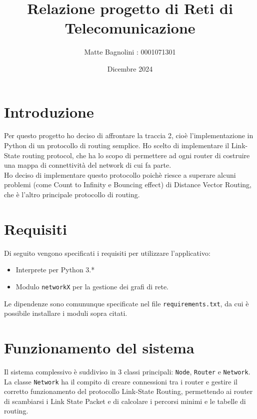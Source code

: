 \documentclass{article}
\title{Relazione progetto di Reti di Telecomunicazione}
\author{Matte Bagnolini : 0001071301}
\date{Dicembre 2024}
\begin{document}
\maketitle

\newpage

\tableofcontents

\newpage

\section{Introduzione}

Per questo progetto ho deciso di affrontare la traccia 2, cioè l'implementazione in Python di un protocollo di routing semplice. Ho scelto di implementare il Link-State routing protocol, che ha lo scopo di permettere ad ogni router di costruire una mappa di connettività del network di cui fa parte. \\
Ho deciso di implementare questo protocollo poichè riesce a superare alcuni problemi (come Count to Infinity e Bouncing effect) di Distance Vector Routing, che è l'altro principale protocollo di routing.

\newpage

\section{Requisiti}
Di seguito vengono specificati i requisiti per utilizzare l'applicativo:
\begin{itemize}
    \item Interprete per Python 3.*
    \item Modulo \texttt{networkX} per la gestione dei grafi di rete.
\end{itemize}
Le dipendenze sono comununque specificate nel file \texttt{requirements.txt}, da cui è possibile installare i moduli sopra citati.

\newpage

\section{Funzionamento del sistema}
Il sistema complessivo è suddiviso in 3 classi principali: \texttt{Node}, \texttt{Router} e \texttt{Network}. \\
La classe \texttt{Network} ha il compito di creare connessioni tra i router e gestire il corretto funzionamento del protocollo Link-State Routing, permettendo ai router di scambiarsi i Link State Packet e di calcolare i percorsi minimi e le tabelle di routing.\\
\end{document}
